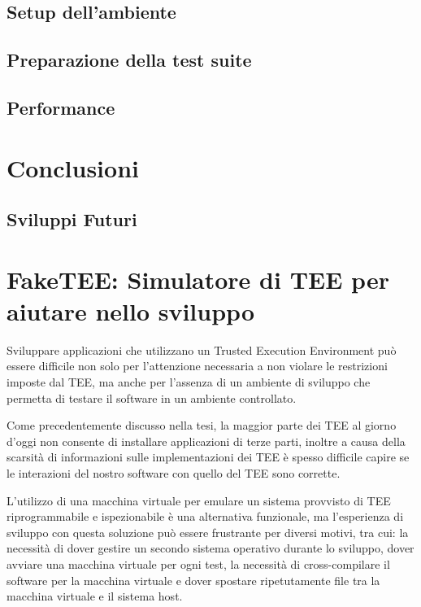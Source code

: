 \documentclass[12pt,italian]{report}
\begin{document}
\section{Setup dell'ambiente}
\label{sec:setup-ambiente}

\section{Preparazione della test suite}
\label{sec:preparazione-test-suite}

\section{Performance}
\label{sec:performance}

\chapter{Conclusioni}
\label{chap:conclusioni}

\section{Sviluppi Futuri}
\label{sec:sviluppi-futuri}

\appendix
\chapter{FakeTEE: Simulatore di TEE per aiutare nello sviluppo}
\label{app:faketee}
Sviluppare applicazioni che utilizzano un Trusted Execution Environment può
essere difficile non solo per l'attenzione necessaria a non violare
le restrizioni imposte dal TEE, ma anche per l'assenza di un ambiente di
sviluppo che permetta di testare il software in un ambiente controllato.

Come precedentemente discusso nella tesi, la maggior parte dei TEE al giorno
d'oggi non consente di installare applicazioni di terze parti, inoltre
a causa della scarsità di informazioni sulle implementazioni dei TEE
è spesso difficile capire se le interazioni del nostro software con quello
del TEE sono corrette.

L'utilizzo di una macchina virtuale per emulare un sistema provvisto di TEE
riprogrammabile e ispezionabile è una alternativa funzionale, ma
l'esperienza di sviluppo con questa soluzione può essere frustrante per
diversi motivi, tra cui: la necessità di dover gestire un secondo sistema
operativo durante lo sviluppo, dover avviare una macchina virtuale per ogni
test, la necessità di cross-compilare il software per la macchina virtuale
e dover spostare ripetutamente file tra la macchina virtuale e il sistema
host.
\end{document}
